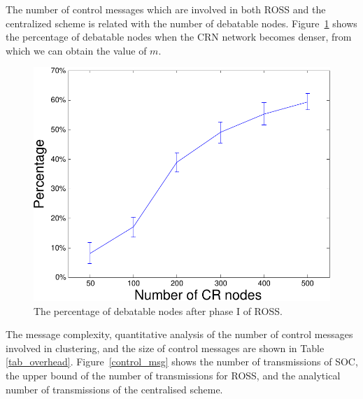 \documentclass[10pt,journal,compsoc]{IEEEtran}
\theoremstyle{mytheoremstyle}
\theoremstyle{mytheoremstyle}
\theoremstyle{mytheoremstyle}
\begin{document}
The number of control messages which are involved in both ROSS and the centralized scheme is related with the number of debatable nodes.
Figure~\ref{percentage_overlapping_node} shows the percentage of debatable nodes when the CRN network becomes denser, from which we can obtain the value of $m$.
\begin{figure}[ht!]
  \centering
  \includegraphics[width=0.6\linewidth]{percentage_overlapping_node.pdf}
  \caption{The percentage of debatable nodes after phase I of ROSS.}\label{percentage_overlapping_node}
\end{figure}
%
%
%
%
The message complexity, quantitative analysis of the number of control messages involved in clustering, and the size of control messages are shown in Table \ref{tab_overhead}.
%
Figure~\ref{control_msg} shows the number of transmissions of SOC, the upper bound of the number of transmissions for ROSS, and the analytical number of transmissions of the centralised scheme. 
\end{document}
